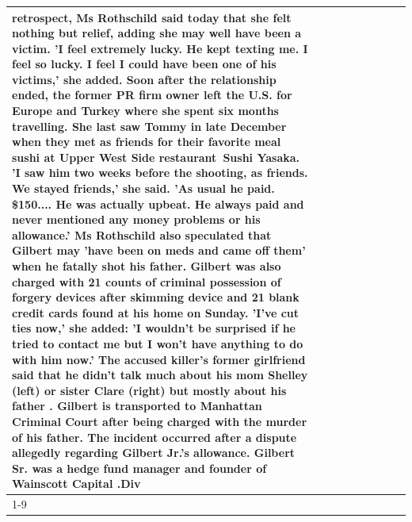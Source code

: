 \begin{table}[H]
\begin{tabular}{lllrlllll}
retrospect, Ms Rothschild said today that she felt nothing but relief, adding she may well have been a victim. 'I feel extremely lucky. He kept texting me. I feel so lucky. I feel I could have been one of his victims,' she added. Soon after the relationship ended, the former PR firm owner left the U.S. for Europe and Turkey where she spent six months  travelling. She last saw Tommy in late December when they met as friends for their favorite meal sushi at Upper West Side restaurant Sushi Yasaka. 'I saw him two weeks before the shooting, as friends. We stayed friends,' she said. 'As usual he paid. \$150.... He was actually upbeat. He always paid and never mentioned any money problems or his allowance.' Ms Rothschild also speculated that Gilbert may 'have been on meds and came off them' when he fatally shot his father. Gilbert was also charged with 21 counts of criminal possession of forgery devices after skimming device and 21 blank credit cards found at his home on Sunday. 'I've cut ties now,' she added: 'I wouldn’t be surprised if he tried to contact me but I won’t have anything to do with him now.' The accused killer's former girlfriend said that he didn't talk much about his mom Shelley (left) or sister Clare (right) but mostly about his father . Gilbert is transported to Manhattan Criminal Court  after being charged with the murder of his father. The incident occurred after a dispute allegedly regarding Gilbert Jr.'s allowance. Gilbert Sr. was a hedge fund manager and founder of Wainscott Capital .Div \\
\cline{1-9} \cline{2-9}

\end{tabular}
\end{table}

